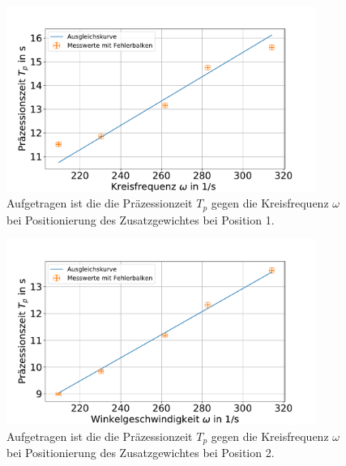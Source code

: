 \begin{figure}[h]
	\centering
	\includegraphics[width=0.9\textwidth]{res/sproHzunten.pdf}
	\caption{Aufgetragen ist die die Präzessionzeit $T_p$ gegen die Kreisfrequenz $\omega$ bei Positionierung des Zusatzgewichtes bei Position 1.}
	\label{fig:Kreiselunten}
\end{figure}
\begin{figure}[h]
	\centering
	\includegraphics[width=0.9\textwidth]{res/sproHzmitte.pdf}
	\caption{Aufgetragen ist die die Präzessionzeit $T_p$ gegen die Kreisfrequenz $\omega$ bei Positionierung des Zusatzgewichtes bei Position 2.}
	\label{fig:Kreiselmitte}
\end{figure}

